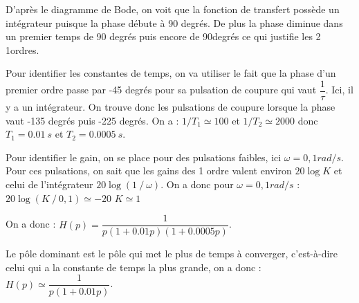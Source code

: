 \ifprof
\begin{corrige}
D’après le diagramme de Bode, on voit que la fonction de transfert possède un intégrateur puisque la phase débute à 90 degrés. De plus la phase diminue dans un premier temps de 90 degrés puis encore de 90degrés ce qui justifie les 2 1\ier ordres.

Pour identifier les constantes de temps, on va utiliser le fait que la phase d’un premier ordre passe par -45 degrés pour sa pulsation de coupure qui vaut $\dfrac{1}{\tau}$.
Ici, il y a un intégrateur. On trouve donc les pulsations de coupure lorsque la phase vaut -135 degrés puis -225 degrés. On a :
$1/T_1 \simeq 100$      et      $1/T_2 \simeq 2000$     donc    $T_1=\SI{0.01}{s}$ et
$T_2=\SI{0.0005}{s}$.

Pour identifier le gain, on se place pour des pulsations faibles, ici $\omega =0,1 rad/s$. Pour ces pulsations, on sait que les gains des 1\ier{} ordre valent environ $20\log K$ et celui de l’intégrateur $20\log(1⁄\omega)$. On a donc pour $\omega=0,1 rad/s$ :
$20 \log(K⁄0,1) \simeq -20 $  $K\simeq 1$

On a donc : $H(p)=\dfrac{1}{p(1+0.01p)(1+0.0005p)}$.

Le pôle dominant est le pôle qui met le plus de temps à converger, c’est-à-dire celui qui a la constante de temps la plus grande, on a donc :
$H(p)\simeq \dfrac{1}{p(1+0.01p)}$.
\end{corrige}
\else
\begin{center}
\end{center}

